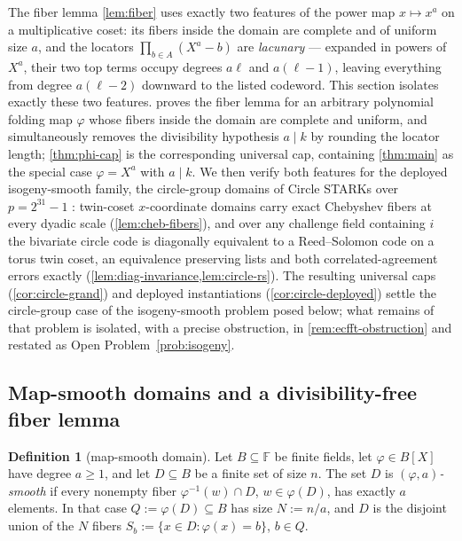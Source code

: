 \documentclass[11pt]{article}
\theoremstyle{definition}
\newtheorem{definition}[theorem]{Definition}
\theoremstyle{remark}
\newcommand{\F}{\mathbb{F}}
\newcommand{\B}{B}
\begin{document}
The fiber lemma \cref{lem:fiber} uses exactly two features of the power map $x\mapsto x^a$ on a multiplicative coset: its fibers inside the domain are complete and of uniform size $a$, and the locators $\prod_{b\in A}(X^a-b)$ are \emph{lacunary} --- expanded in powers of $X^a$, their two top terms occupy degrees $a\ell$ and $a(\ell-1)$, leaving everything from degree $a(\ell-2)$ downward to the listed codeword. This section isolates exactly these two features.  proves the fiber lemma for an arbitrary polynomial folding map $\varphi$ whose fibers inside the domain are complete and uniform, and simultaneously removes the divisibility hypothesis $a\mid k$ by rounding the locator length; \cref{thm:phi-cap} is the corresponding universal cap, containing \cref{thm:main} as the special case $\varphi=X^a$ with $a\mid k$. We then verify both features for the deployed isogeny-smooth family, the circle-group domains of Circle STARKs over $p=2^{31}-1$ \cite{HLP24}: twin-coset $x$-coordinate domains carry exact Chebyshev fibers at every dyadic scale (\cref{lem:cheb-fibers}), and over any challenge field containing $i$ the bivariate circle code is diagonally equivalent to a Reed--Solomon code on a torus twin coset, an equivalence preserving lists and both correlated-agreement errors exactly (\cref{lem:diag-invariance,lem:circle-rs}). The resulting universal caps (\cref{cor:circle-grand}) and deployed instantiations (\cref{cor:circle-deployed}) settle the circle-group case of the isogeny-smooth problem posed below; what remains of that problem is isolated, with a precise obstruction, in \cref{rem:ecfft-obstruction} and restated as Open Problem~\ref{prob:isogeny}.

\subsection{Map-smooth domains and a divisibility-free fiber lemma}
\label{sec:map-smooth}

\begin{definition}[map-smooth domain]\label{def:map-smooth}
Let $\B\subseteq\F$ be finite fields, let $\varphi\in\B[X]$ have degree $a\ge1$, and let $D\subseteq\B$ be a finite set of size $n$. The set $D$ is \emph{$(\varphi,a)$-smooth} if every nonempty fiber $\varphi^{-1}(w)\cap D$, $w\in\varphi(D)$, has exactly $a$ elements. In that case $Q:=\varphi(D)\subseteq\B$ has size $N:=n/a$, and $D$ is the disjoint union of the $N$ fibers $S_b:=\{x\in D:\varphi(x)=b\}$, $b\in Q$.
\end{definition}
\end{document}
